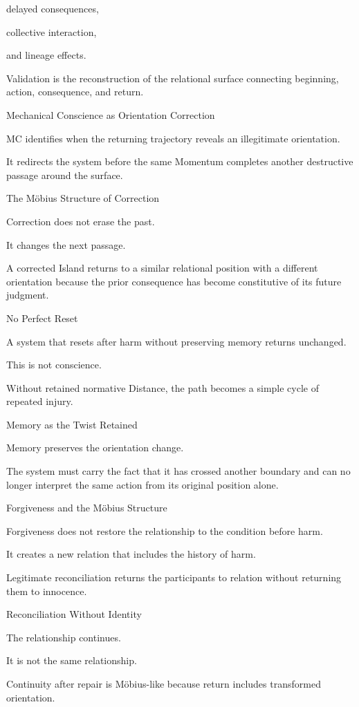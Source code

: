 delayed consequences,

collective interaction,

and lineage effects.

Validation is the reconstruction of the relational surface connecting beginning, action, consequence, and return.

Mechanical Conscience as Orientation Correction

MC identifies when the returning trajectory reveals an illegitimate orientation.

It redirects the system before the same Momentum completes another destructive passage around the surface.

The Möbius Structure of Correction

Correction does not erase the past.

It changes the next passage.

A corrected Island returns to a similar relational position with a different orientation because the prior consequence has become constitutive of its future judgment.

No Perfect Reset

A system that resets after harm without preserving memory returns unchanged.

This is not conscience.

Without retained normative Distance, the path becomes a simple cycle of repeated injury.

Memory as the Twist Retained

Memory preserves the orientation change.

The system must carry the fact that it has crossed another boundary and can no longer interpret the same action from its original position alone.

Forgiveness and the Möbius Structure

Forgiveness does not restore the relationship to the condition before harm.

It creates a new relation that includes the history of harm.

Legitimate reconciliation returns the participants to relation without returning them to innocence.

Reconciliation Without Identity

The relationship continues.

It is not the same relationship.

Continuity after repair is Möbius-like because return includes transformed orientation.

